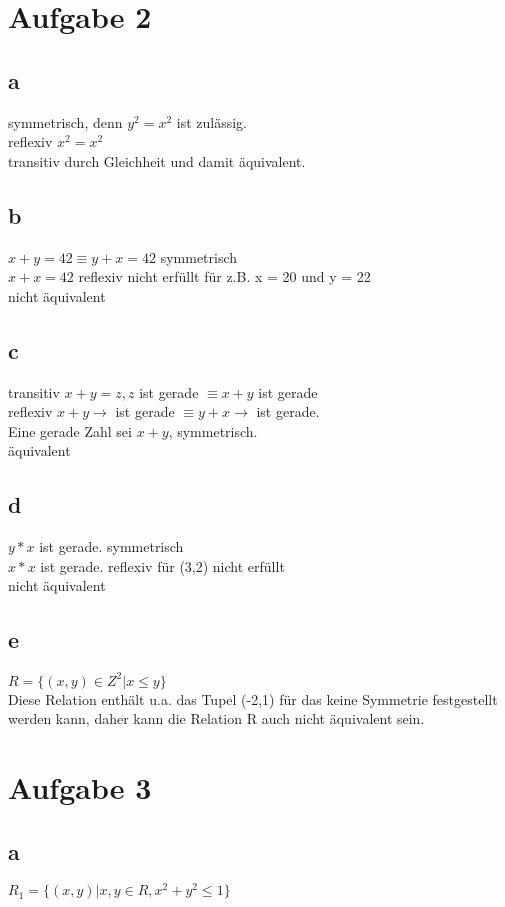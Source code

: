 \documentclass{article}
\begin{document}
	\section*{Aufgabe 2}
	\subsection*{a}
	symmetrisch, denn $y^2 = x^2$ ist zulässig. \\
	reflexiv $x^2 = x^2$ \\
	transitiv durch Gleichheit und damit äquivalent.
	\subsection*{b}
	$x+y = 42 \equiv y+x = 42$ symmetrisch \\
	$x + x = 42$ reflexiv nicht erfüllt für z.B. x = 20 und y = 22  \\
	nicht äquivalent
	\subsection*{c}
	transitiv $x + y = z, z$ ist gerade $\equiv x + y$ ist gerade \\
	reflexiv $x + y \to$ ist gerade $\equiv y + x \to$ ist gerade. \\
	Eine gerade Zahl sei $x + y$, symmetrisch. \\
	äquivalent
	\subsection*{d}
	$y * x$ ist gerade. symmetrisch \\
	$x * x$ ist gerade. reflexiv für (3,2) nicht erfüllt \\
	nicht äquivalent
	\subsection*{e}
	$R = \{(x,y) \in Z^2 | x \leq y\}$ \\
	Diese Relation enthält u.a. das Tupel (-2,1) für das keine Symmetrie festgestellt werden kann, daher kann die Relation R auch nicht äquivalent sein.
	\section*{Aufgabe 3}
	\subsection*{a}
	$R_1 = \{(x,y) | x,y \in R, x^2 + y^2 \leq 1\}$
\end{document}
